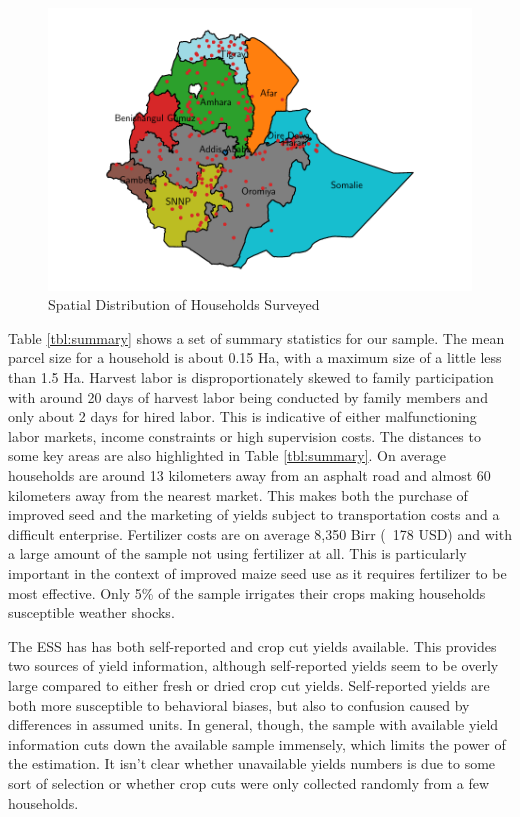 \documentclass{article}
\begin{document}
\begin{figure}
    \centering
    \includegraphics{results/figures/map_hhids.pdf}
    \caption{Spatial Distribution of Households Surveyed}
    \label{map:regions}
\end{figure}

Table \ref{tbl:summary} shows a set of summary statistics for our sample. The mean parcel size for a household is about 0.15 Ha, with a maximum size of a little less than 1.5 Ha. Harvest labor is disproportionately skewed to family participation with around 20 days of harvest labor being conducted by family members and only about 2 days for hired labor. This is indicative of either malfunctioning labor markets, income constraints or high supervision costs. The distances to some key areas are also highlighted in Table \ref{tbl:summary}. On average households are around 13 kilometers away from an asphalt road and almost 60 kilometers away from the nearest market. This makes both the purchase of improved seed and the marketing of yields subject to transportation costs and a difficult enterprise. Fertilizer costs are on average 8,350 Birr (~178 USD) and with a large amount of the sample not using fertilizer at all. This is particularly important in the context of improved maize seed use as it requires fertilizer to be most effective. Only 5\% of the sample irrigates their crops making households susceptible weather shocks.

{\small\tabcolsep=3pt  %
    
}

The ESS has has both self-reported and crop cut yields available. This provides two sources of yield information, although self-reported yields seem to be overly large compared to either fresh or dried crop cut yields. Self-reported yields are both more susceptible to behavioral biases, but also to confusion caused by differences in assumed units. In general, though, the sample with available yield information cuts down the available sample immensely, which limits the power of the estimation. It isn't clear whether unavailable yields numbers is due to some sort of selection or whether crop cuts were only collected randomly from a few households.
\end{document}
